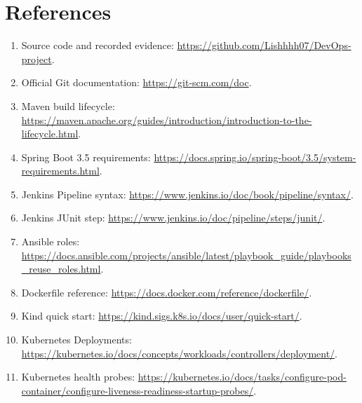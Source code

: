 \documentclass[12pt,a4paper]{article}
\begin{document}
\section*{References}
\begin{enumerate}[nosep]
\item Source code and recorded evidence: \url{https://github.com/Lishhhh07/DevOps-project}.
\item Official Git documentation: \url{https://git-scm.com/doc}.
\item Maven build lifecycle: \url{https://maven.apache.org/guides/introduction/introduction-to-the-lifecycle.html}.
\item Spring Boot 3.5 requirements: \url{https://docs.spring.io/spring-boot/3.5/system-requirements.html}.
\item Jenkins Pipeline syntax: \url{https://www.jenkins.io/doc/book/pipeline/syntax/}.
\item Jenkins JUnit step: \url{https://www.jenkins.io/doc/pipeline/steps/junit/}.
\item Ansible roles: \url{https://docs.ansible.com/projects/ansible/latest/playbook_guide/playbooks_reuse_roles.html}.
\item Dockerfile reference: \url{https://docs.docker.com/reference/dockerfile/}.
\item Kind quick start: \url{https://kind.sigs.k8s.io/docs/user/quick-start/}.
\item Kubernetes Deployments: \url{https://kubernetes.io/docs/concepts/workloads/controllers/deployment/}.
\item Kubernetes health probes: \url{https://kubernetes.io/docs/tasks/configure-pod-container/configure-liveness-readiness-startup-probes/}.
\end{enumerate}
\end{document}
